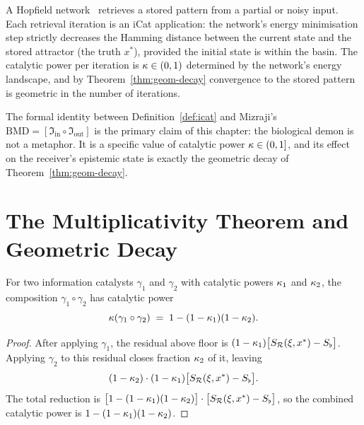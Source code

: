 \begin{example}\label{ex:neural-icat}
A Hopfield network~\citep{friston2010} retrieves a stored pattern from a partial or noisy input. Each retrieval iteration is an iCat application: the network's energy minimisation step strictly decreases the Hamming distance between the current state and the stored attractor (the truth $x^*$), provided the initial state is within the basin. The catalytic power per iteration is $\kappa \in (0,1)$ determined by the network's energy landscape, and by Theorem~\ref{thm:geom-decay} convergence to the stored pattern is geometric in the number of iterations.
\end{example}

The formal identity between Definition~\ref{def:icat} and Mizraji's $\mathrm{BMD} = [\mathfrak{I}_{\mathrm{in}} \circ \mathfrak{I}_{\mathrm{out}}]$ is the primary claim of this chapter: the biological demon is not a metaphor. It is a specific value of catalytic power $\kappa \in (0,1]$, and its effect on the receiver's epistemic state is exactly the geometric decay of Theorem~\ref{thm:geom-decay}.


\section{The Multiplicativity Theorem and Geometric Decay}
\label{sec:multiplicativity}

\begin{theorem}\label{thm:mult-cat-power}
For two information catalysts $\gamma_1$ and $\gamma_2$ with catalytic powers $\kappa_1$ and $\kappa_2$, the composition $\gamma_1 \circ \gamma_2$ has catalytic power
\[
\kappa(\gamma_1 \circ \gamma_2) \;=\; 1 - (1 - \kappa_1)(1 - \kappa_2).
\]
\end{theorem}

\begin{proof}
After applying $\gamma_1$, the residual above floor is $(1 - \kappa_1)\bigl[S_{\mathcal{R}}(\xi, x^*) - S_{\flat}\bigr]$. Applying $\gamma_2$ to this residual closes fraction $\kappa_2$ of it, leaving
\[
(1 - \kappa_2) \cdot (1 - \kappa_1)\bigl[S_{\mathcal{R}}(\xi, x^*) - S_{\flat}\bigr].
\]
The total reduction is $\bigl[1 - (1-\kappa_1)(1-\kappa_2)\bigr] \cdot \bigl[S_{\mathcal{R}}(\xi, x^*) - S_{\flat}\bigr]$, so the combined catalytic power is $1 - (1-\kappa_1)(1-\kappa_2)$.
\end{proof}

